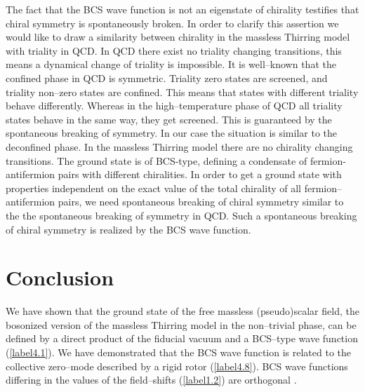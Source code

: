 \documentclass[a4paper,12pt] {article}
\begin{document}
The fact that the BCS wave function is not an eigenstate of chirality
testifies that chiral symmetry is spontaneously broken. In order to
clarify this assertion we would like to draw a similarity between
chirality in the massless Thirring model with triality in QCD. In QCD
there exist no triality changing transitions, this means a dynamical
change of triality is impossible. It is well--known that the confined
phase in QCD is \coordHE{} symmetric. Triality zero states are screened,
and triality non--zero states are confined. This means that states
with different triality behave differently. Whereas in the
high--temperature phase of QCD all triality states behave in the same
way, they get screened. This is guaranteed by the spontaneous breaking
of \coordHE{} symmetry. In our case the situation is similar to the
deconfined phase. In the massless Thirring model there are no
chirality changing transitions. The ground state is of BCS-type,
defining a condensate of fermion-antifermion pairs with different
chiralities. In order to get a ground state with properties
independent on the exact value of the total chirality of all
fermion--antifermion pairs, we need spontaneous breaking of chiral
symmetry similar to the the spontaneous breaking of \coordHE{} symmetry in
QCD. Such a spontaneous breaking of chiral symmetry is realized by the
BCS wave function.


\section{Conclusion}

\hspace{0.2in} We have shown that the ground state of the free
massless (pseudo)scalar field, the bosonized version of the massless
Thirring model in the non--trivial phase, can be defined by a direct
product of the fiducial vacuum \myHighlight{$|\Psi_0\rangle$}\coordHE{} and a BCS--type wave
function (\ref{label4.1}). We have demonstrated that the BCS wave
function is related to the collective zero--mode described by a rigid
rotor (\ref{label4.8}). BCS wave functions differing in the values of
the field--shifts (\ref{label1.2}) are orthogonal \coordHE{}.
\end{document}
